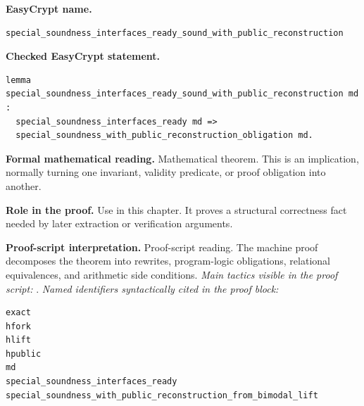 \begin{formaltheorem}
\noindent\textbf{EasyCrypt name.}
\begin{lstlisting}[language=EasyCrypt,basicstyle=\ttfamily\scriptsize]
special_soundness_interfaces_ready_sound_with_public_reconstruction
\end{lstlisting}
\noindent\textbf{Checked EasyCrypt statement.}
\begin{lstlisting}[language=EasyCrypt,basicstyle=\ttfamily\scriptsize]
lemma special_soundness_interfaces_ready_sound_with_public_reconstruction md :
  special_soundness_interfaces_ready md =>
  special_soundness_with_public_reconstruction_obligation md.
\end{lstlisting}
\noindent\textbf{Formal mathematical reading.}
Mathematical theorem. This is an implication, normally turning one invariant, validity predicate, or proof obligation into another.

\noindent\textbf{Role in the proof.}
Use in this chapter. It proves a structural correctness fact needed by later extraction or verification arguments.

\noindent\textbf{Proof-script interpretation.}
Proof-script reading. The machine proof decomposes the theorem into rewrites, program-logic obligations, relational equivalences, and arithmetic side conditions.
\emph{Main tactics visible in the proof script:} .
\emph{Named identifiers syntactically cited in the proof block:}
\begin{lstlisting}[language=EasyCrypt,basicstyle=\ttfamily\scriptsize]
exact
hfork
hlift
hpublic
md
special_soundness_interfaces_ready
special_soundness_with_public_reconstruction_from_bimodal_lift
\end{lstlisting}

\end{formaltheorem}

